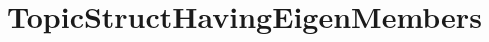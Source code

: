 \hypertarget{group___topic_struct_having_eigen_members}{}\section{Topic\+Struct\+Having\+Eigen\+Members}
\label{group___topic_struct_having_eigen_members}
